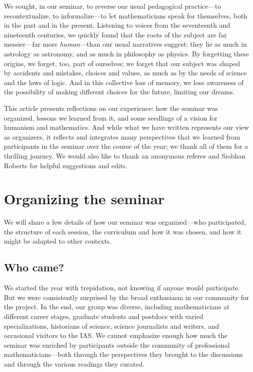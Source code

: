 \documentclass{article}
\begin{document}
 
We sought, in our seminar, to reverse our usual pedagogical practice---to recontextualize, to informalize---to let mathematicians speak for themselves, both in the past and in the present. Listening to voices from the seventeenth and nineteenth centuries, we quickly found that the roots of the subject are far messier---far more {\em human}---than our usual narratives suggest: they lie as much in astrology as astronomy, and as much in philosophy as physics. By forgetting these origins, we forget, too, part of ourselves; we forget that our subject was shaped by accidents and mistakes, choices and values, as much as by the needs of science and the laws of logic. And in this collective loss of memory, we lose awareness of the possibility of making different choices for the future, limiting our dreams.

This article presents reflections on our experience: how the seminar was organized, lessons we learned from it, and some seedlings of a vision for humanism and mathematics. And while what we have written represents our view as organizers, it reflects and integrates many perspectives that we learned from participants in the seminar over the course of the year; we thank all of them for a thrilling journey. We would also like to thank an anonymous referee and Siobhan Roberts
for helpful suggestions and edits. 





\section{Organizing the seminar}
We will share a few details of how our seminar was organized—who participated, the structure of each session, the curriculum and how it was chosen, and how it might be adapted to other contexts.

\subsection{Who came?}
 

We started the year with trepidation, not knowing if anyone would participate. But we were consistently surprised by the broad enthusiasm in our community for the project. In the end, our group was diverse, including mathematicians at different career stages, graduate students and postdocs with varied specializations, historians of science, science journalists and writers, and occasional visitors to the IAS. We cannot emphasize enough how much the seminar was enriched by   participants outside the community of professional mathematicians—both through the perspectives they brought to the discussions and through the various readings they curated.
 
\end{document}
